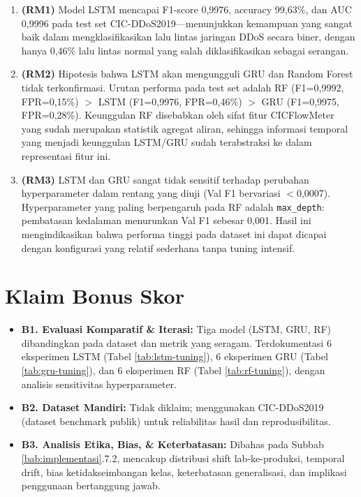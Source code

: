 \documentclass[11pt,a4paper,oneside]{report}
\begin{document}
\begin{enumerate}[leftmargin=*]
    \item \textbf{(RM1)} Model LSTM mencapai F1-score 0,9976, accuracy 99,63\%, dan AUC 0,9996 pada test set CIC-DDoS2019---menunjukkan kemampuan yang sangat baik dalam mengklasifikasikan lalu lintas jaringan DDoS secara biner, dengan hanya 0,46\% lalu lintas normal yang salah diklasifikasikan sebagai serangan.

    \item \textbf{(RM2)} Hipotesis bahwa LSTM akan mengungguli GRU dan Random Forest tidak terkonfirmasi. Urutan performa pada test set adalah RF (F1=0,9992, FPR=0,15\%) $>$ LSTM (F1=0,9976, FPR=0,46\%) $>$ GRU (F1=0,9975, FPR=0,28\%). Keunggulan RF disebabkan oleh sifat fitur CICFlowMeter yang sudah merupakan statistik agregat aliran, sehingga informasi temporal yang menjadi keunggulan LSTM/GRU sudah terabstraksi ke dalam representasi fitur ini.

    \item \textbf{(RM3)} LSTM dan GRU sangat tidak sensitif terhadap perubahan hyperparameter dalam rentang yang diuji (Val F1 bervariasi $<$0,0007). Hyperparameter yang paling berpengaruh pada RF adalah \texttt{max\_depth}: pembatasan kedalaman menurunkan Val F1 sebesar 0,001. Hasil ini mengindikasikan bahwa performa tinggi pada dataset ini dapat dicapai dengan konfigurasi yang relatif sederhana tanpa tuning intensif.
\end{enumerate}

\section{Klaim Bonus Skor}

\begin{itemize}[leftmargin=*]
    \item[$\checkmark$] \textbf{B1. Evaluasi Komparatif \& Iterasi:} Tiga model (LSTM, GRU, RF) dibandingkan pada dataset dan metrik yang seragam. Terdokumentasi 6 eksperimen LSTM (Tabel \ref{tab:lstm-tuning}), 6 eksperimen GRU (Tabel \ref{tab:gru-tuning}), dan 6 eksperimen RF (Tabel \ref{tab:rf-tuning}), dengan analisis sensitivitas hyperparameter.
    \item[$\square$] \textbf{B2. Dataset Mandiri:} Tidak diklaim; menggunakan CIC-DDoS2019 (dataset benchmark publik) untuk reliabilitas hasil dan reprodusibilitas.
    \item[$\checkmark$] \textbf{B3. Analisis Etika, Bias, \& Keterbatasan:} Dibahas pada Subbab \ref{bab:implementasi}.7.2, mencakup distribusi shift lab-ke-produksi, temporal drift, bias ketidakseimbangan kelas, keterbatasan generalisasi, dan implikasi penggunaan bertanggung jawab.
\end{itemize}
\end{document}
